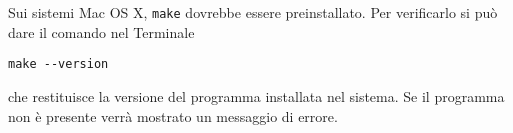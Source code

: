 Sui sistemi Mac OS X, \verb|make| dovrebbe essere preinstallato.  Per
verificarlo si può dare il comando nel Terminale
\begin{verbatim}
make --version
\end{verbatim}
che restituisce la versione del programma installata nel sistema.  Se il
programma non è presente verrà mostrato un messaggio di errore.

